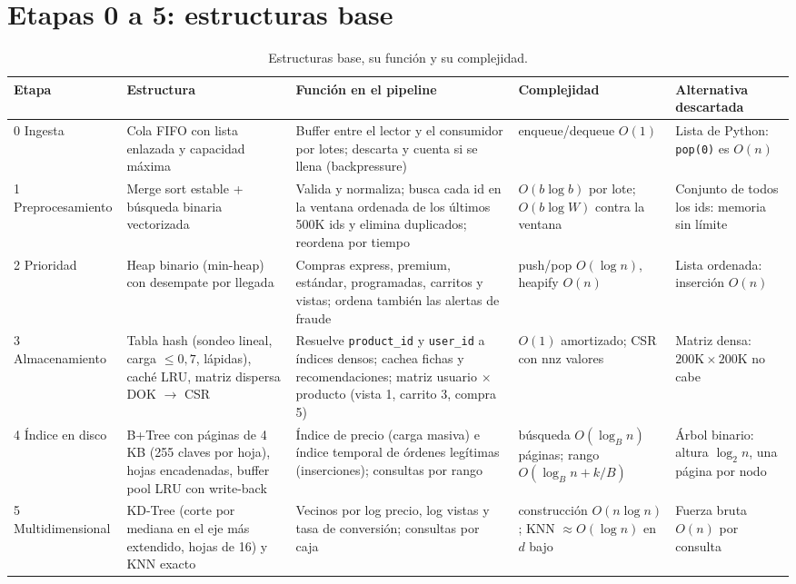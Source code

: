 \documentclass[11pt,letterpaper]{article}
\begin{document}
\section{Etapas 0 a 5: estructuras base}

\begin{table}[!htbp]
\centering\footnotesize
\begin{tabularx}{\linewidth}{@{}p{1.9cm}LLp{2.7cm}p{2.5cm}@{}}
\toprule
\textbf{Etapa} & \textbf{Estructura} & \textbf{Función en el pipeline} & \textbf{Complejidad} & \textbf{Alternativa descartada}\\
 Ingesta & Cola FIFO con lista enlazada y capacidad máxima & Buffer entre el lector y el consumidor por lotes; descarta y cuenta si se llena (backpressure) & enqueue/dequeue $O(1)$ & Lista de Python: \texttt{pop(0)} es $O(n)$\\
1 Preprocesa\-miento & Merge sort estable + búsqueda binaria vectorizada & Valida y normaliza; busca cada id en la ventana ordenada de los últimos 500K ids y elimina duplicados; reordena por tiempo & $O(b\log b)$ por lote; $O(b\log W)$ contra la ventana & Conjunto de todos los ids: memoria sin límite\\
2 Prioridad & Heap binario (min-heap) con desempate por llegada & Compras express, premium, estándar, programadas, carritos y vistas; ordena también las alertas de fraude & push/pop $O(\log n)$, heapify $O(n)$ & Lista ordenada: inserción $O(n)$\\
3 Almacena\-miento & Tabla hash (sondeo lineal, carga $\le 0{,}7$, lápidas), caché LRU, matriz dispersa DOK $\to$ CSR & Resuelve \texttt{product\_id} y \texttt{user\_id} a índices densos; cachea fichas y recomendaciones; matriz usuario $\times$ producto (vista 1, carrito 3, compra 5) & $O(1)$ amortizado; CSR con nnz valores & Matriz densa: $200\text{K}\times200\text{K}$ no cabe\\
4 Índice en disco & B+Tree con páginas de 4\,KB (255 claves por hoja), hojas encadenadas, buffer pool LRU con write-back & Índice de precio (carga masiva) e índice temporal de órdenes legítimas (inserciones); consultas por rango & búsqueda $O(\log_B n)$ páginas; rango $O(\log_B n + k/B)$ & Árbol binario: altura $\log_2 n$, una página por nodo\\
5 Multidi\-mensional & KD-Tree (corte por mediana en el eje más extendido, hojas de 16) y KNN exacto & Vecinos por log precio, log vistas y tasa de conversión; consultas por caja & construcción $O(n\log n)$; KNN $\approx O(\log n)$ en $d$ bajo & Fuerza bruta $O(n)$ por consulta\\
\bottomrule
\end{tabularx}
\caption{Estructuras base, su función y su complejidad.}
\end{table}
\end{document}
